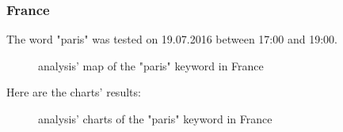 \documentclass[a4paper,11pt]{report}
\begin{document}
\subsubsection{France}
The word "paris" was tested on 19.07.2016 between 17:00 and 19:00.
\begin{figure}[H]
\vspace{-5pt}
\begin{center}
\vspace{-5pt}
\caption{analysis' map of the "paris" keyword in France}
\end{center}
\end{figure}
\vspace{-10pt}
\newpage

Here are the charts' results:
\begin{figure}[H]
\vspace{-5pt}
\begin{center}
\vspace{-5pt}
\caption{analysis' charts of the "paris" keyword in France}
\end{center}
\end{figure}
\vspace{-10pt}
\end{document}
